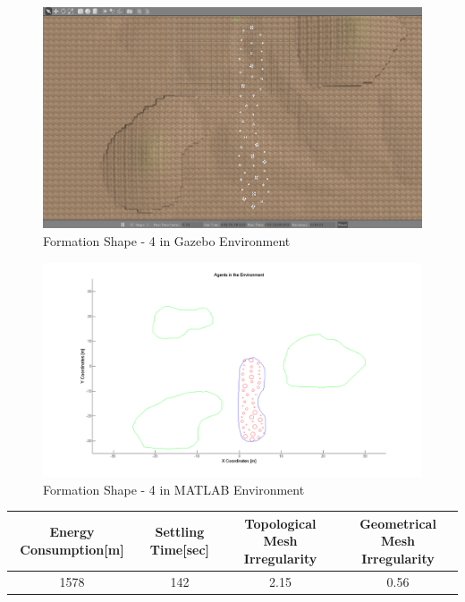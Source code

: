 \documentclass[twoside]{article}
\begin{document}
				 
			
			\begin{figure}[H]
				\caption{Formation Shape - 4 in Gazebo Environment}
				\centerline{\includegraphics[scale = 0.35]{4_Gazebo}}
			\end{figure} 
			
			\begin{figure}[H]
				\caption{Formation Shape - 4 in MATLAB Environment}
				\centerline{\includegraphics[scale = 0.40]{4}}
			\end{figure} 
			
			\begin{center}
				 \label{tab:title} 
				\begin{tabular}{||c| c |c |c ||}
					
					\hline
					\textbf{Energy Consumption[m]}  & \textbf{Settling Time[sec]} & \textbf{Topological Mesh Irregularity} & \textbf{Geometrical Mesh Irregularity}\\ 
					\hline
					1578 & 142 &  2.15& 0.56\\
					\hline
				\end{tabular}
			\end{center}
		
\end{document}
